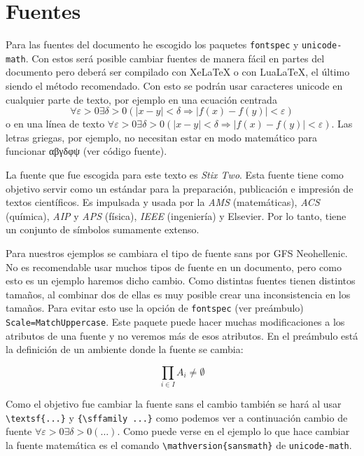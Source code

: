 
\chapter{Fuentes}
Para las fuentes del documento he escogido los paquetes \texttt{fontspec} y
\texttt{unicode-math}. Con estos será posible cambiar fuentes de manera fácil
en partes del documento pero deberá ser compilado con Xe\LaTeX{} o con
Lua\LaTeX, el último siendo el método recomendado. Con esto se podrán
usar caracteres unicode en cualquier parte de texto, por ejemplo en una
ecuación centrada
\[
  ∀ε>0∃δ>0(|x-y|<δ ⇒ |f(x)-f(y)|<ε)
\]
o en una línea de texto \(∀ε>0∃δ>0(|x-y|<δ ⇒ |f(x)-f(y)|<ε)\). Las letras
griegas, por ejemplo, no necesitan estar en modo matemático para funcionar
αβγδφψ (ver código fuente).

La fuente que fue escogida para este texto es \textit{Stix Two}. Esta fuente
tiene como objetivo servir como un estándar para la preparación, publicación
e impresión de textos científicos. Es impulsada y usada por la \textit{AMS}
(matemáticas), \textit{ACS} (química), \textit{AIP} y \textit{APS} (física),
\textit{IEEE} (ingeniería) y Elsevier. Por lo tanto, tiene un conjunto de
símbolos sumamente extenso.

Para nuestros ejemplos se cambiara el tipo de fuente sans por GFS
Neohellenic. No es recomendable usar muchos tipos de fuente en un documento,
pero como esto es un ejemplo haremos dicho cambio. Como distintas fuentes
tienen distintos tamaños, al combinar dos de ellas es muy posible crear una
inconsistencia en los tamaños. Para evitar esto use la opción de
\texttt{fontspec} (ver preámbulo) \texttt{Scale=MatchUppercase}. Este paquete
puede hacer muchas modificaciones a los atributos de una fuente y no veremos
más de esos atributos. En el preámbulo está la definición de un ambiente donde
la fuente se cambia:
\begin{sans}%
\label{textosans}
  \lipsum[1][1-3]
  \[
    \prod_{i\in I}A_i\ne\emptyset
  \]
\end{sans}
Como el objetivo fue cambiar la fuente sans el cambio también se hará al usar
\verb|\textsf{...}| y \verb|{\sffamily ...}| como podemos ver a continuación
\textsf{cambio de fuente
\(\forall\varepsilon>0\exists\delta>0(\ldots)\)}. Como
puede verse en el ejemplo lo que hace cambiar la fuente matemática es el
comando \verb|\mathversion{sansmath}| de \texttt{unicode-math}.

